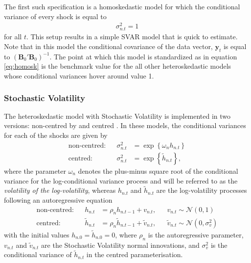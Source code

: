 \documentclass[
  nojss]{jss}
\begin{document}
The first such specification is a homoskedastic model for which the
conditional variance of every shock is equal to \begin{align}
\sigma_{n.t}^2 = 1 \label{eq:homosk}
\end{align} for all \(t\). This setup results in a simple SVAR model
that is quick to estimate. Note that in this model the conditional
covariance of the data vector, \(\mathbf{y}_t\) is equal to
\((\mathbf{B}_0'\mathbf{B}_0)^{-1}\). The point at which this model is
standardized as in equation \eqref{eq:homosk} is the benchmark value for
the all other heteroskedastic models whose conditional variances hover
around value 1.

\subsubsection{Stochastic Volatility}

The heteroskedastic model with Stochastic Volatility is implemented in
two versions: non-centred by \cite{LSUW2024} and centred
\cite{chankoopyu2024}. In these models, the conditional variances for
each of the shocks are given by \begin{align}
\text{non-centred:}&&\sigma_{n.t}^2 &= \exp\left\{\omega_n h_{n.t}\right\}\\
\text{centred:}&&\sigma_{n.t}^2 &= \exp\left\{\tilde{h}_{n.t}\right\},
\end{align} where the parameter \(\omega_n\) denotes the plus-minus
square root of the conditional variance for the log-conditional variance
process and will be referred to as the
\emph{volatility of the log-volatility}, whereas \(h_{n.t}\) and
\(\tilde{h}_{n.t}\) are the log-volatility processes following an
autoregressive equation \begin{align}
\text{non-centred:}&&h_{n.t} &= \rho_n h_{n.t-1} + v_{n.t}, && v_{n.t}\sim\mathcal{N}\left(0,1\right)\\
\text{centred:}&&\tilde{h}_{n.t} &= \rho_n \tilde{h}_{n.t-1} + \tilde{v}_{n.t}, && \tilde{v}_{n.t}\sim\mathcal{N}\left(0,\sigma_v^2\right)
\end{align} with the initial values \(h_{n.0} = \tilde{h}_{n.0} = 0\),
where \(\rho_n\) is the autoregressive parameter, \(v_{n.t}\) and
\(\tilde{v}_{n.t}\) are the Stochastic Volatility normal innovations,
and \(\sigma_v^2\) is the conditional variance of \(\tilde{h}_{n.t}\) in
the centred parameterisation.
\end{document}
